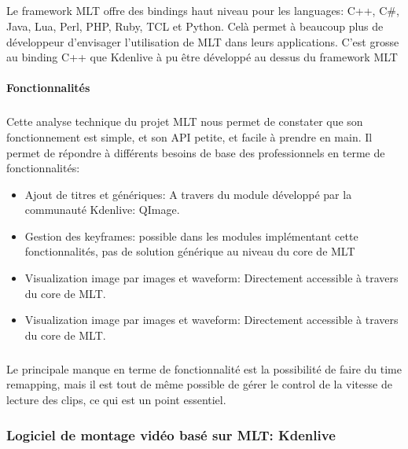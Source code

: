 \subparagraph{}

Le framework MLT offre des bindings haut niveau pour les languages:
C++, C\#, Java, Lua, Perl, PHP, Ruby, TCL et Python. Celà permet à
beaucoup plus de développeur d'envisager l'utilisation de MLT dans
leurs applications. C'est grosse au binding C++ que Kdenlive à pu être
développé au dessus du framework MLT

\paragraph{Fonctionnalités}

\subparagraph{ }

Cette analyse technique du projet MLT nous permet de constater que
son fonctionnement est simple, et son API petite, et facile à prendre
en main.  Il permet de répondre à différents besoins de base  des
professionnels en terme de fonctionnalités:

\begin{itemize}

  \item {Ajout de titres et génériques: A travers du module développé
  par la
    communauté Kdenlive: QImage.}

  \item {Gestion des keyframes: possible dans les modules implémentant
    cette fonctionnalités, pas de solution générique au niveau du
    core de MLT}

  \item {Visualization image par images et waveform: Directement
  accessible à
    travers du core de MLT.}

  \item {Visualization image par images et waveform: Directement
  accessible à
    travers du core de MLT.}

\end{itemize}

\subparagraph{}

Le principale manque en terme de fonctionnalité est la possibilité de
faire du time remapping, mais il est tout de même possible de gérer le
control de la vitesse de lecture des clips, ce qui est un point essentiel.

\subsubsection {Logiciel de montage vidéo basé sur MLT: Kdenlive}

\subparagraph{}

